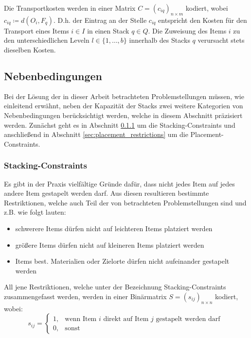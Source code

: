 \vfill
\pagebreak

Die Transportkosten werden in einer Matrix $C = (c_{iq})_{n \times m}$ kodiert,
wobei $c_{iq} \coloneqq d(O_i, F_q)$. D.h. der Eintrag an der Stelle $c_{iq}$ entspricht
den Kosten für den Transport eines Items $i \in I$ in einen Stack $q \in Q$.
Die Zuweisung des Items $i$ zu den unterschiedlichen Leveln $l \in \{1, \dotsc, b\}$ innerhalb des Stacks $q$
verursacht stets dieselben Kosten.

\subsection{Nebenbedingungen}
\label{sec:constraints}

Bei der Lösung der in dieser Arbeit betrachteten Problemstellungen müssen, wie einleitend erwähnt,
neben der Kapazität der Stacks zwei weitere Kategorien von Nebenbedingungen berücksichtigt werden, welche in diesem Abschnitt
präzisiert werden. Zunächst geht es in Abschnitt \ref{sec:stacking_restrictions} um die Stacking-Constraints
und anschließend in Abschnitt \ref{sec:placement_restrictions} um die Placement-Constraints.

\subsubsection{Stacking-Constraints}
\label{sec:stacking_restrictions}

Es gibt in der Praxis vielfältige Gründe dafür, dass nicht jedes Item auf jedes andere Item gestapelt werden darf.
Aus diesen resultieren bestimmte Restriktionen, welche auch Teil der von \citet{Bruns2015} betrachteten Problemstellungen
sind und z.B. wie folgt lauten:
\begin{itemize}
  \item schwerere Items dürfen nicht auf leichteren Items platziert werden
  \item größere Items dürfen nicht auf kleineren Items platziert werden
  \item Items best. Materialien oder Zielorte dürfen nicht aufeinander gestapelt werden
\end{itemize}

All jene Restriktionen, welche unter der Bezeichnung Stacking-Constraints zusammengefasst werden,
werden in einer Binärmatrix $S = (s_{ij})_{n \times n}$ kodiert, wobei:
\[
    s_{ij} =
\begin{cases}
    1, & \text{wenn Item $i$ direkt auf Item $j$ gestapelt werden darf }\\
    0, & \text{sonst}
\end{cases}
\]


